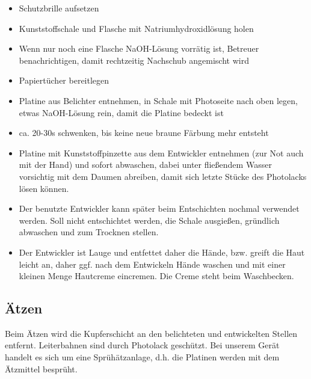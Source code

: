 \documentclass{\basedir/fablab-document}
\begin{document}
\begin{itemize}
\item Schutzbrille aufsetzen
\item Kunststoffschale und Flasche mit Natriumhydroxidlösung holen
\item Wenn nur noch eine Flasche NaOH-Lösung vorrätig ist, Betreuer benachrichtigen, damit rechtzeitig Nachschub angemischt wird
\item Papiertücher bereitlegen
\item Platine aus Belichter entnehmen, in Schale mit Photoseite nach oben legen, etwas NaOH-Lösung rein, damit die Platine bedeckt ist
\item ca. 20-30s schwenken, bis keine neue braune Färbung mehr entsteht
\item Platine mit Kunststoffpinzette aus dem Entwickler entnehmen (zur Not auch mit der Hand) und sofort abwaschen, dabei unter fließendem Wasser vorsichtig mit dem Daumen abreiben, damit sich letzte Stücke des Photolacks lösen können.
\item Der benutzte Entwickler kann später beim Entschichten nochmal verwendet werden. Soll nicht entschichtet werden, die Schale ausgießen, gründlich abwaschen und zum Trocknen stellen.
\item Der Entwickler ist Lauge und entfettet daher die Hände, bzw. greift die Haut leicht an, daher ggf. nach dem Entwickeln Hände waschen und mit einer kleinen Menge Hautcreme eincremen. Die Creme steht beim Waschbecken.
\end{itemize}

\subsection{Ätzen}
\label{sec:aetzen}
Beim Ätzen wird die Kupferschicht an den belichteten und entwickelten Stellen entfernt. Leiterbahnen sind durch Photolack geschützt. Bei unserem Gerät handelt es sich um eine Sprühätzanlage, d.h. die Platinen werden mit dem Ätzmittel besprüht.
\end{document}
